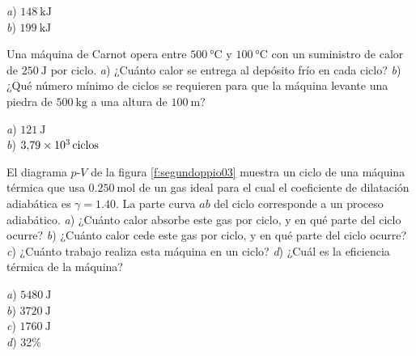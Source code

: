 \begin{Answer}
	\begin{minipage}[t]{.4\textwidth}
    \textit{a}) $\SI{148}{\kilo\joule}$\\ \textit{b}) $\SI{199}{\kilo\joule}$
  \end{minipage}
\end{Answer}
%
\begin{Exercise}
  Una máquina de Carnot opera entre $\SI{500}{\celsius}$ y $\SI{100}{\celsius}$ con un suministro de calor de $\SI{250}{\joule}$ por ciclo. \textit{a}) ¿Cuánto calor se entrega al depósito frío en cada ciclo? \textit{b}) ¿Qué número mínimo de ciclos se requieren para que la máquina levante una piedra de $\SI{500}{\kilogram}$ a una altura de $\SI{100}{\metre}$?
\end{Exercise}
\begin{Answer}
	\begin{minipage}[t]{.4\textwidth}
    \textit{a}) $\SI{121}{\joule}$\\ \textit{b}) $\SI{3.79E3}{ciclos}$
  \end{minipage}
\end{Answer}
%
\begin{Exercise}\label{p:segundoppio03}
  El diagrama $p$-$V$ de la figura \ref{f:segundoppio03} muestra un ciclo de una máquina térmica que usa $\SI{0.250}{\mole}$ de un gas ideal para el cual el coeficiente de dilatación adiabática es $\gamma = 1.40$. La parte curva $ab$ del ciclo corresponde a un proceso adiabático. \textit{a}) ¿Cuánto calor absorbe este gas por ciclo, y en qué parte del ciclo ocurre? \textit{b}) ¿Cuánto calor cede este gas por ciclo, y en qué parte del ciclo ocurre? \textit{c}) ¿Cuánto trabajo realiza esta máquina en un ciclo? \textit{d}) ¿Cuál es la eficiencia térmica de la máquina?
\end{Exercise}
\begin{Answer}
	\begin{minipage}[t]{.4\textwidth}
    \textit{a}) $\SI{5480}{\joule}$\\ \textit{b}) $\SI{3720}{\joule}$\\ \textit{c}) $\SI{1760}{\joule}$\\ \textit{d}) 32\%
  \end{minipage}
\end{Answer}
%
